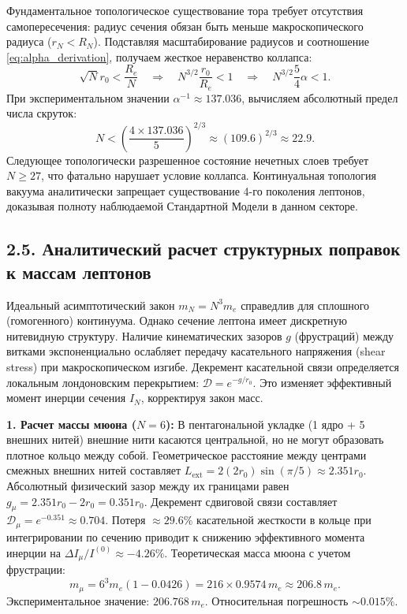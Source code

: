 \documentclass[12pt,a4paper]{article}
\begin{document}
	Фундаментальное топологическое существование тора требует отсутствия самопересечения: радиус сечения обязан быть меньше макроскопического радиуса ($r_N < R_N$). Подставляя масштабирование радиусов и соотношение \eqref{eq:alpha_derivation}, получаем жесткое неравенство коллапса:
	\begin{equation}
		\sqrt{N} r_0 < \frac{R_e}{N} \quad \Longrightarrow \quad N^{3/2} \frac{r_0}{R_e} < 1 \quad \Longrightarrow \quad N^{3/2} \frac{5}{4}\alpha < 1.
	\end{equation}
	При экспериментальном значении $\alpha^{-1} \approx 137.036$, вычисляем абсолютный предел числа скруток:
	\begin{equation}
		N < \left( \frac{4 \times 137.036}{5} \right)^{2/3} \approx (109.6)^{2/3} \approx 22.9.
	\end{equation}
	Следующее топологически разрешенное состояние нечетных слоев требует $N \ge 27$, что фатально нарушает условие коллапса. Континуальная топология вакуума аналитически запрещает существование 4-го поколения лептонов, доказывая полноту наблюдаемой Стандартной Модели в данном секторе.
	
	\subsection{2.5. Аналитический расчет структурных поправок к массам лептонов}
	Идеальный асимптотический закон $m_N = N^3 m_e$ справедлив для сплошного (гомогенного) континуума. Однако сечение лептона имеет дискретную нитевидную структуру. Наличие кинематических зазоров $g$ (фрустраций) между витками экспоненциально ослабляет передачу касательного напряжения (shear stress) при макроскопическом изгибе. Декремент касательной связи определяется локальным лондоновским перекрытием: $\mathcal{D} = e^{-g / r_0}$. Это изменяет эффективный момент инерции сечения $I_N$, корректируя закон масс.
	
	\textbf{1. Расчет массы мюона ($N=6$):} 
	В пентагональной укладке (1 ядро + 5 внешних нитей) внешние нити касаются центральной, но не могут образовать плотное кольцо между собой. Геометрическое расстояние между центрами смежных внешних нитей составляет $L_{\text{ext}} = 2(2r_0) \sin(\pi/5) \approx 2.351 r_0$. Абсолютный физический зазор между их границами равен $g_\mu = 2.351 r_0 - 2 r_0 = 0.351 r_0$. 
	Декремент сдвиговой связи составляет $\mathcal{D}_\mu = e^{-0.351} \approx 0.704$. 
	Потеря $\approx 29.6\%$ касательной жесткости в кольце при интегрировании по сечению приводит к снижению эффективного момента инерции на $\Delta I_\mu / I^{(0)} \approx -4.26\%$. 
	Теоретическая масса мюона с учетом фрустрации:
	\begin{equation}
		m_\mu = 6^3 m_e (1 - 0.0426) = 216 \times 0.9574 \, m_e \approx 206.8 \, m_e.
	\end{equation}
	Экспериментальное значение: $206.768 \, m_e$. Относительная погрешность $\sim 0.015\%$.
	
\end{document}
